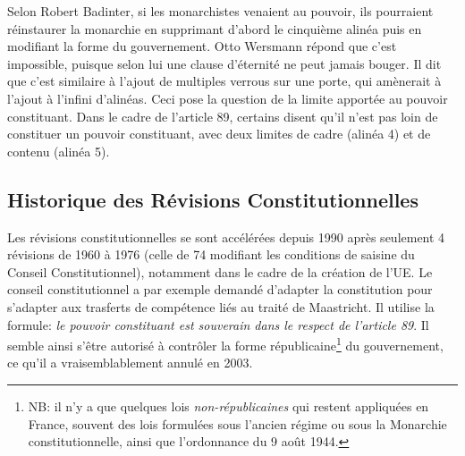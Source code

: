 \documentclass[math]{cours}
\begin{document}
Selon Robert Badinter, si les monarchistes venaient au pouvoir, ils pourraient réinstaurer la monarchie en supprimant d'abord le cinquième alinéa puis en modifiant la forme du gouvernement.
Otto Wersmann répond que c'est impossible, puisque selon lui une clause d'éternité ne peut jamais bouger.
Il dit que c'est similaire à l'ajout de multiples verrous sur une porte, qui amènerait à l'ajout à l'infini d'alinéas.
Ceci pose la question de la limite apportée au pouvoir constituant.
Dans le cadre de l'article 89, certains disent qu'il n'est pas loin de constituer un pouvoir constituant, avec deux limites de cadre (alinéa 4) et de contenu (alinéa 5).

\subsection{Historique des Révisions Constitutionnelles}
Les révisions constitutionnelles se sont accélérées depuis 1990 après seulement 4 révisions de 1960 à 1976 (celle de 74 modifiant les conditions de saisine du Conseil Constitutionnel), notamment dans le cadre de la création de l'UE.
Le conseil constitutionnel a par exemple demandé d'adapter la constitution pour s'adapter aux trasferts de compétence liés au traité de Maastricht. Il utilise la formule: \emph{le pouvoir constituant est souverain dans le respect de l'article 89}.
Il semble ainsi s'être autorisé à contrôler la forme républicaine\footnote{NB: il n'y a que quelques lois \emph{non-républicaines} qui restent appliquées en France, souvent des lois formulées sous l'ancien régime ou sous la Monarchie constitutionnelle, ainsi que l'ordonnance du 9 août 1944.}
du gouvernement, ce qu'il a vraisemblablement annulé en 2003.
\end{document}
